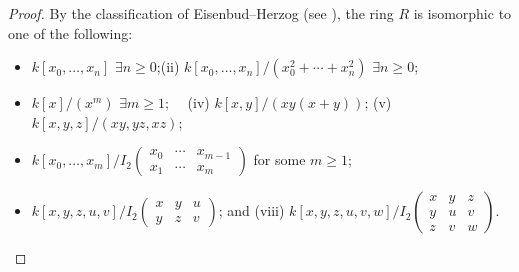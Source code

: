 \documentclass[11pt,a4paper]{amsart}
\numberwithin{equation}{section}
\theoremstyle{definition}
\theoremstyle{remark}
\begin{document}
\begin{proof}
	By the classification of Eisenbud--Herzog (see \cite[Theorem 16.6]{lw}), the ring \(R\) is isomorphic to one of the following:
	
\begin{itemize} \item[(i)] \(k[x_0, \ldots, x_n]\) \(\exists n \geqslant 0\);\quad (ii) \(k[x_0, \ldots, x_n]/(x_0^2 + \cdots + x_n^2)\) \(\exists n \geqslant 0\); \item[(iii)] \(k[x]/(x^m)\) \(\exists m \geqslant 1\); \ \ \quad(iv) \(k[x, y]/(xy(x + y))\); \quad(v) \(k[x, y, z]/(xy, yz, xz)\); \item[(vi)] \(k[x_0, \ldots, x_m]/I_2\!\begin{pmatrix} x_0 & \cdots & x_{m-1} \\ x_1 & \cdots & x_m \end{pmatrix}\) for some \(m \geqslant 1\); \item[(vii)] \(k[x, y, z, u, v]/I_2\!\begin{pmatrix} x & y & u \\ y & z & v \end{pmatrix}\); and (viii) \(k[x, y, z, u, v, w]/I_2 \begin{pmatrix} x & y & z \\ y & u & v \\ z & v & w \end{pmatrix}\). \end{itemize}
	

\end{proof}
\end{document}
